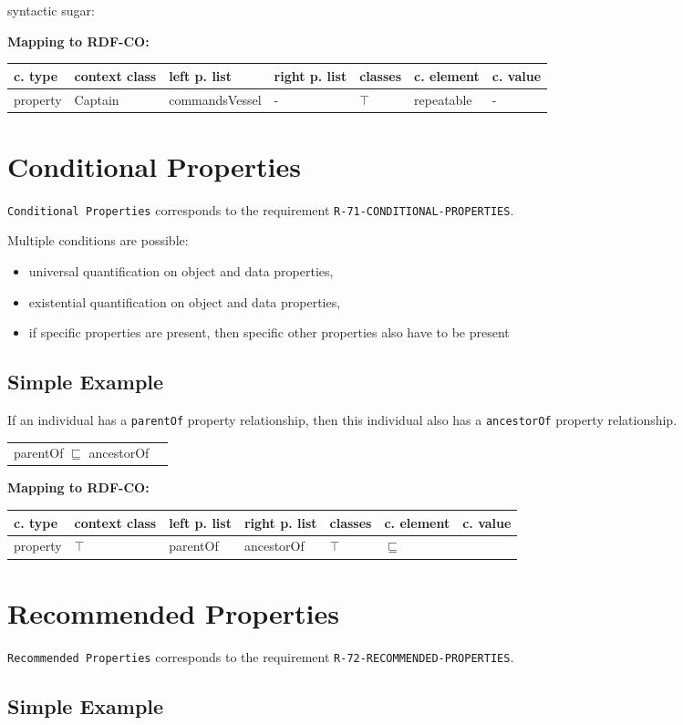 \documentclass{llncs}
\newcommand{\ms}[1]{\texttt{#1}}
\newenvironment{gcotable}{
  \scriptsize
  \sffamily
  \vspace{0cm}
	\begin{center}
	\textbf{\vspace{0.4cm}Mapping to RDF-CO:} \\
  \begin{tabular}{l|l|l|l|l|l|l}
	\hline
  \textbf{c. type} & \textbf{context class} & \textbf{left p. list} & \textbf{right p. list} & \textbf{classes} & \textbf{c. element} & \textbf{c. value} \\
  \hline

}{
  \hline
  \end{tabular}
	\end{center}
}
\newenvironment{DL}{
  \vspace{0cm}
	\begin{center}
  \begin{tabular}{r l}

}{
  \end{tabular}
	\end{center}
}
\begin{document}
syntactic sugar:

\begin{gcotable}
property & Captain & commandsVessel & - & $\top$ & repeatable & - \\
\end{gcotable}

\section{Conditional Properties}

\ms{Conditional Properties} corresponds to the requirement \ms{R-71-CONDITIONAL-PROPERTIES}.

Multiple conditions are possible:

\begin{itemize}
  \item universal quantification on object and data properties,
  \item existential quantification on object and data properties,
  \item if specific properties are present, then specific other properties also have to be present
\end{itemize}

\subsection{Simple Example}

If an individual has a \ms{parentOf} property relationship, then this individual also has a \ms{ancestorOf} property relationship.

\begin{DL}
parentOf $\sqsubseteq$ ancestorOf 
\end{DL}

\begin{gcotable}
property & $\top$ & parentOf & ancestorOf & $\top$ & $\sqsubseteq$ \\
\end{gcotable}

\section{Recommended Properties}

\ms{Recommended Properties} corresponds to the requirement \ms{R-72-RECOMMENDED-PROPERTIES}.

\subsection{Simple Example}
\end{document}
